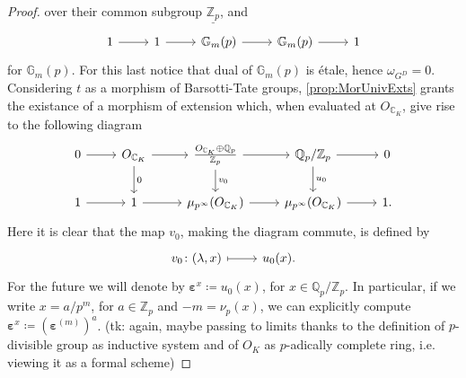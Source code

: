 \begin{proof}
	over their common subgroup $\underline{\mathbb{Z}_{p}}$, and
	\begin{equation*}
	\begin{tikzcd}
		1 \arrow[r, "", rightarrow] &
		1 \arrow[r, "", rightarrow] &
		\mathbb{G}_m(p) \arrow[r, "", rightarrow] &
		\mathbb{G}_m(p) \arrow[r, "", rightarrow] &
		1
	\end{tikzcd}
	\end{equation*}
	for $\mathbb{G}_m(p)$.
	For this last notice that dual of $\mathbb{G}_m(p)$
	is étale, hence $\omega_{G^D} = 0$.
	Considering $t$ as a morphism of Barsotti-Tate groups, \cref{prop:MorUnivExts}
	grants the existance of a morphism of extension which, when
	evaluated at $O_{\mathbb{C}_K}$, give rise to the following diagram
	\begin{equation*}
	\begin{tikzcd}
		0 \arrow[r, "", rightarrow] &
		O_{\mathbb{C}_K} 
		\arrow[d, "0", rightarrow] 
		\arrow[r, "", rightarrow] &
		\frac{ O_{\mathbb{C}_K} \oplus \mathbb{Q}_p }{ \mathbb{Z}_{p} }
		\arrow[d, "v_0", rightarrow] 
		\arrow[r, "", rightarrow] &
		\mathbb{Q}_p/\mathbb{Z}_{p}
		\arrow[d, "u_0", rightarrow] 
		\arrow[r, "", rightarrow] &
		0 \\
		1 \arrow[r, "", rightarrow] &
		1 \arrow[r, "", rightarrow] &
		\mu_{p^\infty}(O_{\mathbb{C}_K})
		\arrow[r, "", rightarrow] &
		\mu_{p^\infty}(O_{\mathbb{C}_K})
		\arrow[r, "", rightarrow] &
		1
	.\end{tikzcd}
	\end{equation*}
	Here it is clear that the map $v_0$, making the diagram commute, is defined by
	\begin{equation*}
	\begin{tikzcd}[row sep = 0ex
		,/tikz/column 1/.append style={anchor=base east}
		,/tikz/column 2/.append style={anchor=base west}]
		v_0\colon 
		(\lambda, x) \arrow[r, "", mapsto] & 
		u_0(x)
	.\end{tikzcd}
	\end{equation*} 
	For the future we will denote by $\boldsymbol\varepsilon^x \coloneqq u_0(x)$,
	for $x \in \mathbb{Q}_p/\mathbb{Z}_{p}$.
	In particular, if we write $x = a/p^m$, for $a \in \mathbb{Z}_{p}$ and $-m = \nu_p(x)$,
	we can explicitly compute $\boldsymbol\varepsilon^x \coloneqq 
	\left( \boldsymbol\varepsilon^{(m)} \right)^a$.
	 (tk: again, maybe passing to limits
	thanks to the definition of $p$-divisible group as inductive system and
	of $O_K$ as $p$-adically complete ring, i.e. viewing it as a formal scheme)

\end{proof}
